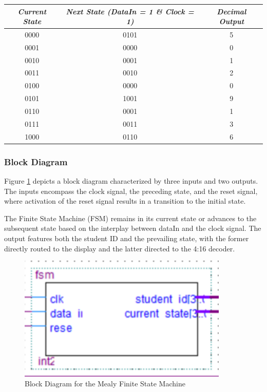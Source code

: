 		\begin{table}[H]
			\centering
			\begin{tabular}{|c|c|c|}
			\hline
			\hline
				\textit{Current State} & \textit{Next State (DataIn = 1 \& Clock = 1)} & \textit{Decimal Output} \\ 
				\hline
				\hline
				0000 & 0101 & 5 \\ \hline
				0001 & 0000 & 0 \\ \hline
				0010 & 0001 & 1 \\ \hline
				0011 & 0010 & 2 \\ \hline
				0100 & 0000 & 0 \\ \hline
				0101 & 1001 & 9 \\ \hline
				0110 & 0001 & 1 \\ \hline
				0111 & 0011 & 3 \\ \hline
				1000 & 0110 & 6 \\ \hline
			\hline
			\end{tabular}
		\end{table}
	
	\subsubsection{{Block Diagram}}
	
		{Figure \ref{FSM} depicts a block diagram characterized by three inputs and two outputs. The inputs encompass the clock signal, the preceding state, and the reset signal, where activation of the reset signal results in a transition to the initial state.}
		
		{The Finite State Machine (FSM) remains in its current state or advances to the subsequent state based on the interplay between dataIn and the clock signal. The output features both the student ID and the prevailing state, with the former directly routed to the display and the latter directed to the 4:16 decoder.}

		\begin{figure}[H]
			\centering
			\includegraphics[width=10cm]{Pictures/FSM.png}
			\caption{{Block Diagram for the Mealy Finite State Machine}}
			\label{FSM}
		\end{figure}
	
